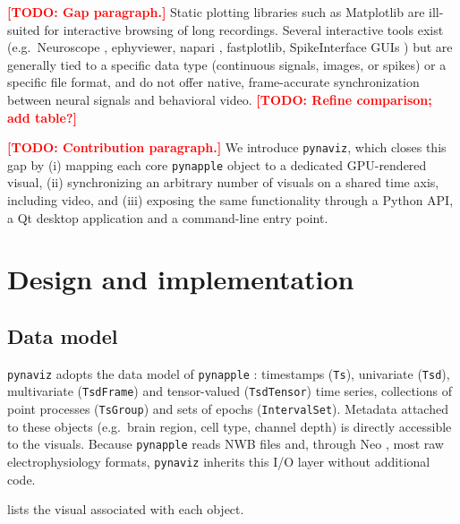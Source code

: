 \documentclass[11pt]{article}
\newcommand{\todo}[1]{\textcolor{red}{\textbf{[TODO: #1]}}}
\newcommand{\pynaviz}{\texttt{pynaviz}}
\newcommand{\pynapple}{\texttt{pynapple}}
\begin{document}
\todo{Gap paragraph.} Static plotting libraries such as Matplotlib
\citep{hunter2007matplotlib} are ill-suited for interactive browsing of long
recordings. Several interactive tools exist (e.g.\ Neuroscope
\citep{hazan2006klusters}, ephyviewer, napari \citep{napari}, fastplotlib,
SpikeInterface GUIs \citep{buccino2020spikeinterface}) but are generally
tied to a specific data type (continuous signals, images, or spikes) or a
specific file format, and do not offer native, frame-accurate synchronization
between neural signals and behavioral video. \todo{Refine comparison; add
table?}

\todo{Contribution paragraph.} We introduce \pynaviz{}, which closes this gap
by (i) mapping each core \pynapple{} object to a dedicated GPU-rendered
visual, (ii) synchronizing an arbitrary number of visuals on a shared time
axis, including video, and (iii) exposing the same functionality through a
Python API, a Qt desktop application and a command-line entry point.

\section{Design and implementation}
\label{sec:design}

\subsection{Data model}
\pynaviz{} adopts the data model of \pynapple{} \citep{viejo2023pynapple}:
timestamps (\texttt{Ts}), univariate (\texttt{Tsd}), multivariate
(\texttt{TsdFrame}) and tensor-valued (\texttt{TsdTensor}) time series,
collections of point processes (\texttt{TsGroup}) and sets of epochs
(\texttt{IntervalSet}). Metadata attached to these objects (e.g.\ brain
region, cell type, channel depth) is directly accessible to the visuals.
Because \pynapple{} reads NWB files \citep{rubel2022nwb} and, through Neo
\citep{garcia2014neo}, most raw electrophysiology formats, \pynaviz{}
inherits this I/O layer without additional code.

 lists the visual associated with each object.
\end{document}
